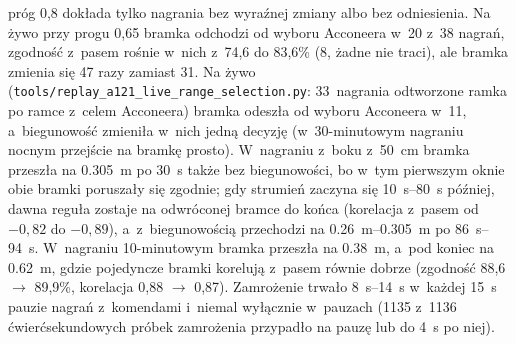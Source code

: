\documentclass[12pt,a4paper,oneside]{report}
\begin{document}
próg 0,8 dokłada tylko nagrania bez wyraźnej zmiany albo bez odniesienia. Na żywo przy progu 0,65
bramka odchodzi od wyboru Acconeera w~20 z~38 nagrań, zgodność z~pasem rośnie w~nich z~74,6 do 83,6\%
(8, żadne nie traci), ale bramka zmienia się 47 razy zamiast 31. Na żywo
(\texttt{tools/replay\_a121\_live\_range\_selection.py}: 33~nagrania
odtworzone ramka po ramce z~celem Acconeera) bramka odeszła od wyboru Acconeera
w~11, a~biegunowość zmieniła w~nich jedną decyzję (w~30-minutowym nagraniu
nocnym przejście na bramkę prosto). W~nagraniu z~boku z~\SI{50}{cm} bramka
przeszła na \SI{0.305}{m} po \SI{30}{s} także bez biegunowości, bo w~tym
pierwszym oknie obie bramki poruszały się zgodnie; gdy strumień zaczyna się
\SIrange{10}{80}{s} później, dawna reguła zostaje na odwróconej bramce do końca
(korelacja z~pasem od $-0{,}82$ do $-0{,}89$), a~z~biegunowością przechodzi na
\SIrange{0.26}{0.305}{m} po \SIrange{86}{94}{s}. W~nagraniu 10-minutowym
bramka przeszła na \SI{0.38}{m}, a~pod koniec na \SI{0.62}{m}, gdzie
pojedyncze bramki korelują z~pasem równie dobrze (zgodność 88,6
$\rightarrow$ 89,9\%, korelacja 0,88 $\rightarrow$ 0,87). Zamrożenie trwało
\SIrange{8}{14}{s} w~każdej \SI{15}{s} pauzie nagrań z~komendami i~niemal
wyłącznie w~pauzach (1135 z~1136 ćwierćsekundowych próbek zamrożenia
przypadło na pauzę lub do \SI{4}{s} po niej).
\end{document}
